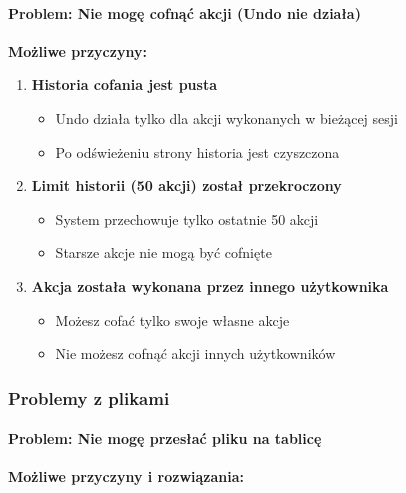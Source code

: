 \documentclass[12pt,a4paper]{article}
\begin{document}
\paragraph{Problem: Nie mogę cofnąć akcji (Undo nie działa)}

\textbf{Możliwe przyczyny:}

\begin{enumerate}
    \item \textbf{Historia cofania jest pusta}
    \begin{itemize}
        \item Undo działa tylko dla akcji wykonanych w bieżącej sesji
        \item Po odświeżeniu strony historia jest czyszczona
    \end{itemize}
    
    \item \textbf{Limit historii (50 akcji) został przekroczony}
    \begin{itemize}
        \item System przechowuje tylko ostatnie 50 akcji
        \item Starsze akcje nie mogą być cofnięte
    \end{itemize}
    
    \item \textbf{Akcja została wykonana przez innego użytkownika}
    \begin{itemize}
        \item Możesz cofać tylko swoje własne akcje
        \item Nie możesz cofnąć akcji innych użytkowników
    \end{itemize}
\end{enumerate}

\subsubsection{Problemy z plikami}

\paragraph{Problem: Nie mogę przesłać pliku na tablicę}

\textbf{Możliwe przyczyny i rozwiązania:}
\end{document}
